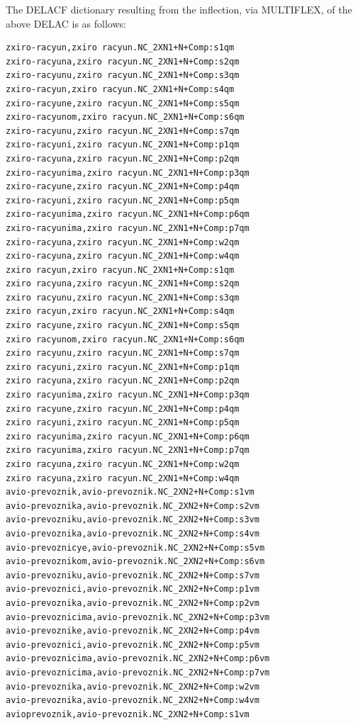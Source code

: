\bigskip
\noindent The DELACF dictionary resulting from the inflection, via MULTIFLEX, of the above DELAC is as follows:

\footnotesize
\begin{verbatim}
zxiro-racyun,zxiro racyun.NC_2XN1+N+Comp:s1qm
zxiro-racyuna,zxiro racyun.NC_2XN1+N+Comp:s2qm
zxiro-racyunu,zxiro racyun.NC_2XN1+N+Comp:s3qm
zxiro-racyun,zxiro racyun.NC_2XN1+N+Comp:s4qm
zxiro-racyune,zxiro racyun.NC_2XN1+N+Comp:s5qm
zxiro-racyunom,zxiro racyun.NC_2XN1+N+Comp:s6qm
zxiro-racyunu,zxiro racyun.NC_2XN1+N+Comp:s7qm
zxiro-racyuni,zxiro racyun.NC_2XN1+N+Comp:p1qm
zxiro-racyuna,zxiro racyun.NC_2XN1+N+Comp:p2qm
zxiro-racyunima,zxiro racyun.NC_2XN1+N+Comp:p3qm
zxiro-racyune,zxiro racyun.NC_2XN1+N+Comp:p4qm
zxiro-racyuni,zxiro racyun.NC_2XN1+N+Comp:p5qm
zxiro-racyunima,zxiro racyun.NC_2XN1+N+Comp:p6qm
zxiro-racyunima,zxiro racyun.NC_2XN1+N+Comp:p7qm
zxiro-racyuna,zxiro racyun.NC_2XN1+N+Comp:w2qm
zxiro-racyuna,zxiro racyun.NC_2XN1+N+Comp:w4qm
zxiro racyun,zxiro racyun.NC_2XN1+N+Comp:s1qm
zxiro racyuna,zxiro racyun.NC_2XN1+N+Comp:s2qm
zxiro racyunu,zxiro racyun.NC_2XN1+N+Comp:s3qm
zxiro racyun,zxiro racyun.NC_2XN1+N+Comp:s4qm
zxiro racyune,zxiro racyun.NC_2XN1+N+Comp:s5qm
zxiro racyunom,zxiro racyun.NC_2XN1+N+Comp:s6qm
zxiro racyunu,zxiro racyun.NC_2XN1+N+Comp:s7qm
zxiro racyuni,zxiro racyun.NC_2XN1+N+Comp:p1qm
zxiro racyuna,zxiro racyun.NC_2XN1+N+Comp:p2qm
zxiro racyunima,zxiro racyun.NC_2XN1+N+Comp:p3qm
zxiro racyune,zxiro racyun.NC_2XN1+N+Comp:p4qm
zxiro racyuni,zxiro racyun.NC_2XN1+N+Comp:p5qm
zxiro racyunima,zxiro racyun.NC_2XN1+N+Comp:p6qm
zxiro racyunima,zxiro racyun.NC_2XN1+N+Comp:p7qm
zxiro racyuna,zxiro racyun.NC_2XN1+N+Comp:w2qm
zxiro racyuna,zxiro racyun.NC_2XN1+N+Comp:w4qm
avio-prevoznik,avio-prevoznik.NC_2XN2+N+Comp:s1vm
avio-prevoznika,avio-prevoznik.NC_2XN2+N+Comp:s2vm
avio-prevozniku,avio-prevoznik.NC_2XN2+N+Comp:s3vm
avio-prevoznika,avio-prevoznik.NC_2XN2+N+Comp:s4vm
avio-prevoznicye,avio-prevoznik.NC_2XN2+N+Comp:s5vm
avio-prevoznikom,avio-prevoznik.NC_2XN2+N+Comp:s6vm
avio-prevozniku,avio-prevoznik.NC_2XN2+N+Comp:s7vm
avio-prevoznici,avio-prevoznik.NC_2XN2+N+Comp:p1vm
avio-prevoznika,avio-prevoznik.NC_2XN2+N+Comp:p2vm
avio-prevoznicima,avio-prevoznik.NC_2XN2+N+Comp:p3vm
avio-prevoznike,avio-prevoznik.NC_2XN2+N+Comp:p4vm
avio-prevoznici,avio-prevoznik.NC_2XN2+N+Comp:p5vm
avio-prevoznicima,avio-prevoznik.NC_2XN2+N+Comp:p6vm
avio-prevoznicima,avio-prevoznik.NC_2XN2+N+Comp:p7vm
avio-prevoznika,avio-prevoznik.NC_2XN2+N+Comp:w2vm
avio-prevoznika,avio-prevoznik.NC_2XN2+N+Comp:w4vm
avioprevoznik,avio-prevoznik.NC_2XN2+N+Comp:s1vm

\end{verbatim}
